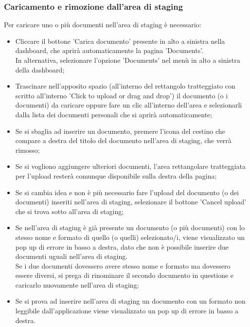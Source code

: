 \documentclass[10pt, a4paper]{article}
\begin{document}
\subsubsection{Caricamento e rimozione dall'area di staging}
Per caricare uno o più documenti nell'area di staging è necessario:
\begin{itemize}
    \item Cliccare il bottone 'Carica documento' presente in alto a sinistra nella dashboard, che aprirà automaticamente la pagina 'Documents'.\\
    In alternativa, selezionare l'opzione 'Documents' nel menù in alto a sinistra della dashboard;
    \item Trascinare nell'apposito spazio (all'interno del rettangolo tratteggiato con scritto all'interno 'Click to upload or drag and drop') il documento (o i documenti) da caricare oppure fare un clic all'interno dell'area e selezionarli dalla lista dei documenti personali che si aprirà automaticamente;
    \item Se si sbaglia ad inserire un documento, premere l'icona del cestino che compare a destra del titolo del documento nell'area di staging, che verrà rimosso;
    \item Se si vogliono aggiungere ulteriori documenti, l'area rettangolare tratteggiata per l'upload resterà comunque disponibile sulla destra della pagina;
    \item Se si cambia idea e non è più necessario fare l'upload del documento (o dei documenti) inseriti nell'area di staging, selezionare il bottone 'Cancel upload' che si trova sotto all'area di staging;
    \item Se nell'area di staging è già presente un documento (o più documenti) con lo stesso nome e formato di quello (o quelli) selezionato/i, viene visualizzato un pop up di errore in basso a destra, dato che non è possibile inserire due documenti uguali nell'area di staging.\\ Se i due documenti dovessero avere stesso nome e formato ma dovessero essere diversi, si prega di rinominare il secondo documento in questione e caricarlo nuovamente nell'area di staging;
    \item Se si prova ad inserire nell'area di staging un documento con un formato non leggibile dall'applicazione viene visualizzato un pop up di errore in basso a destra.
    \end{itemize} 
\end{document}
